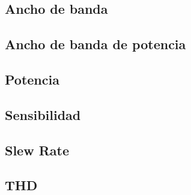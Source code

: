 \vfill

\clearpage


\subsection{Ancho de banda}


\subsection{Ancho de banda de potencia}

\subsection{Potencia}

\subsection{Sensibilidad}

\subsection{Slew Rate}

\subsection{THD}